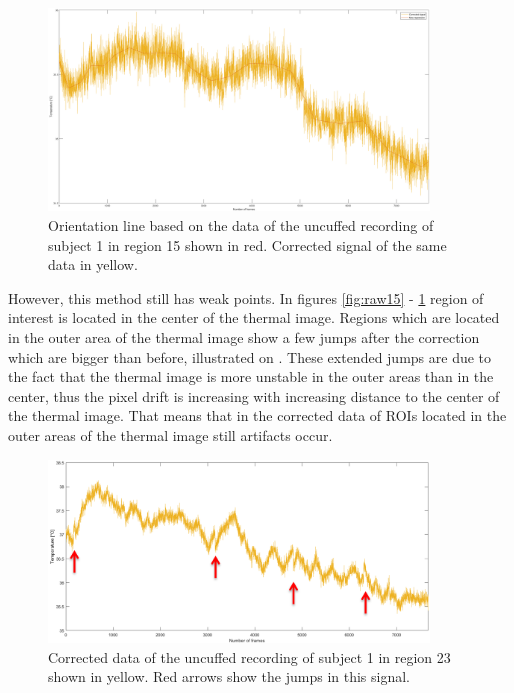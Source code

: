 \begin{figure}[H]
	\includegraphics[width=0.9\textwidth]{figures/corr15}
	\caption{Orientation line based on the data of the uncuffed recording of subject 1 in region 15 shown in red. Corrected signal of the same data in yellow.}
	\label{fig:corr15}
\end{figure}
However, this method still has weak points. In figures \ref{fig:raw15} - \ref{fig:corr15} region of interest is located in the center of the thermal image. Regions which are located in the outer area of the thermal image show a few jumps after the correction which are bigger than before, illustrated on . These extended jumps are due to the fact that the thermal image is more unstable in the outer areas than in the center, thus the pixel drift is increasing with increasing distance to the center of the thermal image. That means that in the corrected data of ROIs located in the outer areas of the thermal image still artifacts occur. 
\begin{figure}[H]
	\includegraphics[width=0.9\textwidth]{figures/corr23pfeile}
	\caption{Corrected data of the uncuffed recording of subject 1 in region 23 shown in yellow. Red arrows show the jumps in this signal.}
	\label{fig:corr23}
\end{figure}